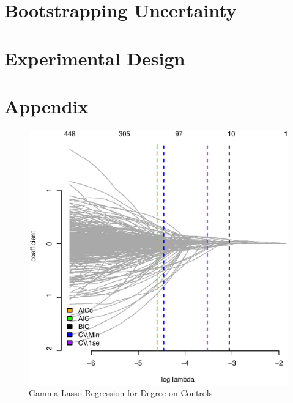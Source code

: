 \documentclass[11pt, fleqn]{article}
\begin{document}
\section{Bootstrapping Uncertainty}

\section{Experimental Design}

\section{Appendix}

\begin{figure}[!htb]
  \centering
  \includegraphics[scale=.5]{treat_aic.eps}
  \caption{Gamma-Lasso Regression for Degree on Controls}
  \label{fig:treat_aic}
\end{figure}


\end{document}
